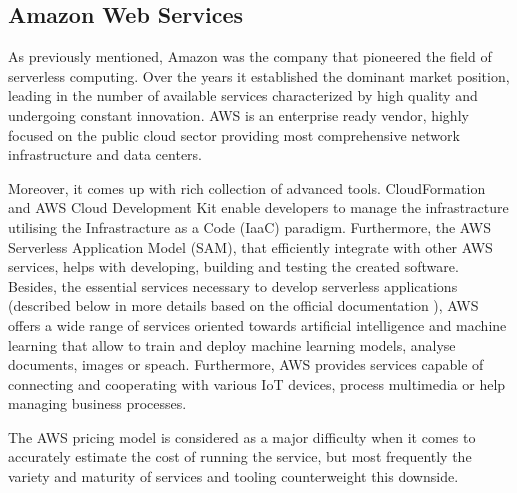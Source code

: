 
\subsection{Amazon Web Services}

As previously mentioned, Amazon was the company that pioneered the field of serverless computing. Over the years it established the dominant market position, leading in the number of available services characterized by high quality and undergoing constant innovation. AWS is an enterprise ready vendor, highly focused on the public cloud sector providing most comprehensive network infrastructure and data centers.

Moreover, it comes up with rich collection of advanced tools. CloudFormation and AWS Cloud Development Kit enable developers to manage the infrastracture utilising the Infrastracture as a Code (IaaC) paradigm. Furthermore, the AWS Serverless Application Model (SAM), that efficiently integrate with other AWS services, helps with developing, building and testing the created software. Besides, the essential services necessary to develop serverless applications (described below in more details based on the official documentation \cite{AWSServerlessOffering}), AWS offers a wide range of services oriented towards artificial intelligence and machine learning that allow to train and deploy machine learning models, analyse documents, images or speach. Furthermore, AWS provides services capable of connecting and cooperating with various IoT devices, process multimedia or help managing business processes.

The AWS pricing model is considered as a major difficulty when it comes to accurately estimate the cost of running the service, but most frequently the variety and maturity of services and tooling counterweight this downside.


